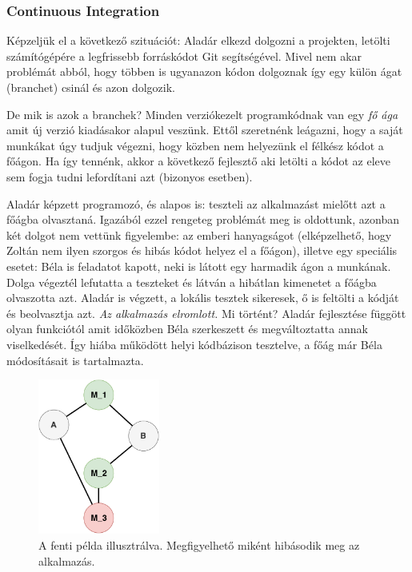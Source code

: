 \subsubsection{Continuous Integration}
Képzeljük el a következő szituációt: Aladár elkezd dolgozni a projekten, letölti számítógépére a legfrissebb forráskódot Git segítségével. Mivel nem akar problémát abból, hogy többen is ugyanazon kódon dolgoznak így egy külön ágat (branchet) csinál és azon dolgozik.

De mik is azok a branchek? Minden verziókezelt programkódnak van egy \textit{fő ága} amit új verzió kiadásakor alapul veszünk. Ettől szeretnénk leágazni, hogy a saját munkákat úgy tudjuk végezni, hogy közben nem helyezünk el félkész kódot a főágon.\cite{Branch_Git} Ha így tennénk, akkor a következő fejlesztő aki letölti a kódot az eleve sem fogja tudni lefordítani azt (bizonyos esetben).

Aladár képzett programozó, és alapos is: teszteli az alkalmazást mielőtt azt a főágba olvasztaná. Igazából ezzel rengeteg problémát meg is oldottunk, azonban két dolgot nem vettünk figyelembe: az emberi hanyagságot (elképzelhető, hogy Zoltán nem ilyen szorgos és hibás kódot helyez el a főágon), illetve egy speciális esetet: Béla is feladatot kapott, neki is látott egy harmadik ágon a munkának. Dolga végeztél lefutatta a teszteket és látván a hibátlan kimenetet a főágba olvaszotta azt. Aladár is végzett, a lokális tesztek sikeresek, ő is feltölti a kódját és beolvasztja azt. \textit{Az alkalmazás elromlott.} Mi történt?
Aladár fejlesztése függött olyan funkciótól amit időközben Béla szerkeszett és megváltoztatta annak viselkedését. Így hiába működött helyi kódbázison tesztelve, a főág már Béla módosításait is tartalmazta.

\begin{figure}[ht]
\centering
\includegraphics[width=40mm, keepaspectratio]{img/branch_conflict.pdf}
\caption{A fenti példa illusztrálva. Megfigyelhető miként hibásodik meg az alkalmazás.}
\end{figure}

